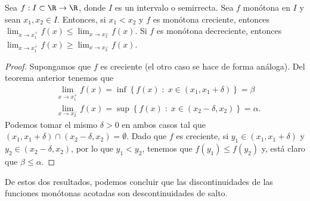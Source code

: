 \begin{ftheorem}[]
\normalfont Sea $\displaystyle f : I \subset \R \to \R $, donde $\displaystyle I $ es un intervalo o semirrecta. Sea $\displaystyle f $ monótona en $\displaystyle I $ y sean $\displaystyle x_{1}, x_{2} \in I $. Entonces, si $\displaystyle x_{1} < x_{2} $ y $\displaystyle f $ es monótona creciente, entonces $\displaystyle \lim_{x \to x_{1}^{+}}f\left(x\right) \leq \lim_{x \to x_{2}^{-}}f\left(x\right) $. Si $\displaystyle f $ es monótona decreciente, entonces $\displaystyle \lim_{x \to x_{1}^{+}}f\left(x\right) \geq \lim_{x \to x_{2}^{-}}f\left(x\right) $.
\end{ftheorem}
\begin{proof}
Supongamos que $\displaystyle f $ es creciente (el otro caso se hace de forma análoga). Del teorema anterior tenemos que 
\[
\begin{split}
& \lim_{x \to x_{1}^{+}}f\left(x\right) = \inf \left\{ f\left(x\right) \; : \; x \in \left(x_{1}, x_{1} + \delta \right)\right\} = \beta \\
& \lim_{x \to x_{2}^{-}}f\left(x\right) = \sup \left\{ f\left(x\right) \; : \; x \in \left(x_{2}-\delta, x_{2}\right)\right\} = \alpha .
\end{split}
\]
Podemos tomar el mismo $\displaystyle \delta > 0 $ en ambos casos tal que $\displaystyle \left(x_{1}, x_{1} + \delta \right) \cap \left(x_{2}-\delta, x_{2}\right) = \emptyset $. Dado que $\displaystyle f $ es creciente, si $\displaystyle y_{1} \in \left(x_{1}, x_{1} + \delta \right) $ y $\displaystyle y_{2} \in \left(x_{2}-\delta, x_{2}\right) $, por lo que $\displaystyle y_{1} < y_{2} $, tenemos que $\displaystyle f\left(y_{1}\right) \leq f\left(y_{2}\right) $ y, está claro que $\displaystyle \beta \leq \alpha  $.
\end{proof}
\begin{observation}
\normalfont De estos dos resultados, podemos concluir que las discontinuidades de las funciones monótonas acotadas son descontinuidades de salto.
\end{observation}


